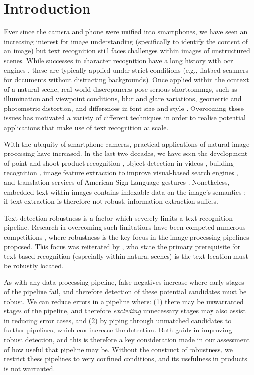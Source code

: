 \chapter{Introduction}
\label{ch:introduction}

Ever since the camera and phone were unified into smartphones, we have seen an increasing interest for image understanding (specifically to identify the content of an image) but text recognition still faces challenges within images of unstructured scenes. While successes in character recognition have a long history with \gls{ocr} engines \citep{Smith:1987tg}, these are typically applied under strict conditions (e.g., flatbed scanners for documents without distracting backgrounds). Once applied within the context of a natural scene, real-world discrepancies pose serious shortcomings, such as illumination and viewpoint conditions, blur and glare variations, geometric and photometric distortion, and differences in font size and style \citep{Zhang:2008vfa, Jung:2004uw}. Overcoming these issues has motivated a variety of different techniques in order to realise potential applications that make use of text recognition at scale.

With the ubiquity of smartphone cameras, practical applications of natural image processing have increased. In the last two decades, we have seen the development of point-and-shoot product recognition \citep{Tsai:2010cn,Girod:2011gw}, object detection in videos \citep{Sivic:2003tj}, building recognition \citep{Takacs:2008cg}, image feature extraction to improve visual-based search engines \citep{Lowe:2004kp,Bay:2008ud}, and translation services of American Sign Language gestures \citep{Jin:2016jd}. Nonetheless, embedded text within images contains indexable data on the image's semantics \citep{Smeulders:2000tx}; if text extraction is therefore not robust, information extraction suffers.

Text detection robustness is a factor which severely limits a text recognition pipeline. Research in overcoming such limitations have been competed numerous competitions \citep{Lucas:2003iw, Lucas:2005bq, Shahab:2011hq, Hua:2004vf}, where robustness is the key focus in the image processing pipelines proposed. This focus was reiterated by \citet{Chen:2011ul}, who state the primary prerequisite for text-based recognition (especially within natural scenes) is the text location must be robustly located.

As with any data processing pipeline, false negatives increase where early stages of the pipeline fail, and therefore detection of these potential candidates must be robust. We can reduce errors in a pipeline where: (1) there may be unwarranted stages of the pipeline, and therefore \textit{excluding} unnecessary stages may also assist in reducing error cases, and (2) by piping through unmatched candidates to further pipelines, which can increase the detection. Both guide in improving robust detection, and this is therefore a key consideration made in our assessment of how useful that pipeline may be. Without the construct of robustness, we restrict these pipelines to very confined conditions, and its usefulness in products is not warranted.

